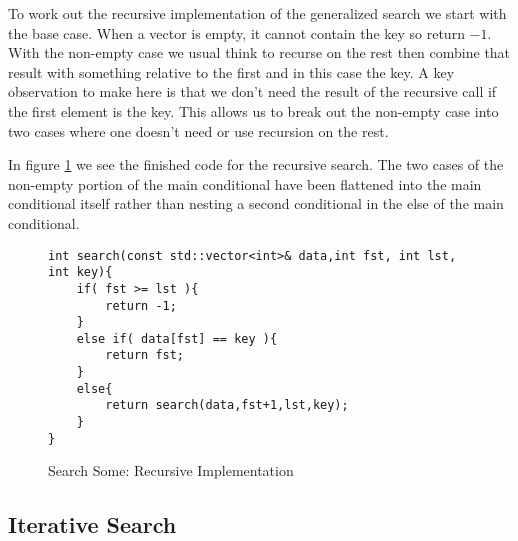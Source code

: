 \documentclass[]{tufte-handout}
\begin{document}
To work out the recursive implementation of the generalized search we start with the base case. When a vector is empty, it cannot contain the key so return $-1$. With the non-empty case we usual think to recurse on the rest then combine that result with something relative to the first and in this case the key. A key observation to make here is that we don't need the result of the recursive call if the first element is the key. This allows us to break out the non-empty case into two cases where one doesn't need or use recursion on the rest. 

In figure \ref{code:searchrecwork} we see the finished code for the recursive search. The two cases of the non-empty portion of the main conditional have been flattened into the main conditional itself rather than nesting a second conditional in the else of the main conditional. 

\begin{figure}[htpb!]
\begin{lstlisting}
int search(const std::vector<int>& data,int fst, int lst, int key){
	if( fst >= lst ){
		return -1;
	}
	else if( data[fst] == key ){
		return fst;
	}
	else{
		return search(data,fst+1,lst,key);
	}
}
\end{lstlisting}
\label{code:searchrecwork}
\caption{Search Some: Recursive Implementation}
\end{figure}



\subsection{Iterative Search}
\end{document}

